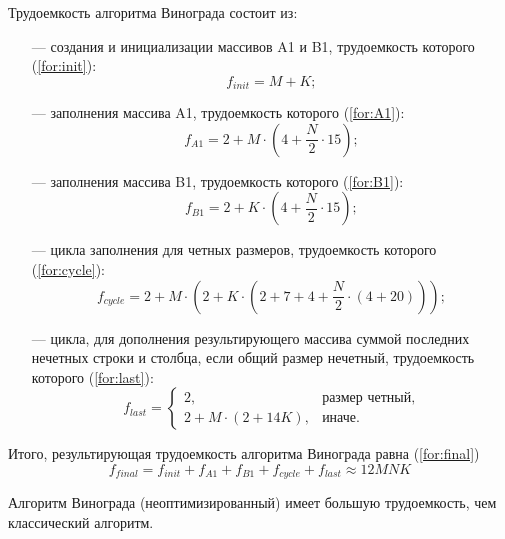 Трудоемкость алгоритма Винограда состоит из:
\begin{itemize}
	\item[---] создания и инициализации массивов A1 и B1, трудоемкость которого (\ref{for:init}):
	\begin{equation}
		\label{for:init}
		f_{init} = M + K;
	\end{equation}
	
	\item[---] заполнения массива A1, трудоемкость которого (\ref{for:A1}):
	\begin{equation}
		\label{for:A1}
		f_{A1} = 2 + M \cdot (4 + \frac{N}{2} \cdot 15);
	\end{equation}
	
	\item[---] заполнения массива B1, трудоемкость которого (\ref{for:B1}):
	\begin{equation}
		\label{for:B1}
		f_{B1} = 2 + K \cdot (4 + \frac{N}{2} \cdot 15);
	\end{equation}
	
	\item[---] цикла заполнения для четных размеров, трудоемкость которого (\ref{for:cycle}):
	\begin{equation}
		\label{for:cycle}
		f_{cycle} = 2 + M \cdot (2 + K \cdot (2 + 7 + 4 + \frac{N}{2} \cdot (4 + 20)));		
	\end{equation}
	
	\item[---] цикла, для дополнения результирующего массива суммой последних нечетных строки и столбца, если общий размер нечетный, трудоемкость которого (\ref{for:last}):
	\begin{equation}
		\label{for:last}
		f_{last} = \begin{cases}
			2, & \text{размер четный,}\\
			2 + M \cdot (2 + 14K), & \text{иначе.}
		\end{cases}
	\end{equation}
\end{itemize}

Итого, результирующая трудоемкость алгоритма Винограда равна (\ref{for:final})
\begin{equation}
	\label{for:final}
	f_{final} = f_{init} + f_{A1} + f_{B1} + f_{cycle} + f_{last} \approx 12MNK
\end{equation}

Алгоритм Винограда (неоптимизированный) имеет большую трудоемкость, чем классический алгоритм.

